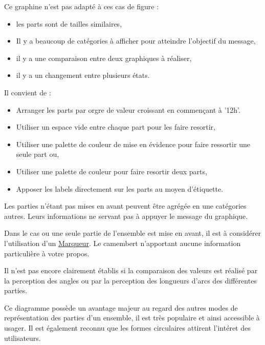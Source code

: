 \documentclass[a4paper,12pt]{article}
\begin{document}
\begin{multicols}{2}
Ce graphine n'est pas adapté à ces cas de figure :
\begin{itemize}
\item les parts sont de tailles similaires,\autocite{sosulskiGraphics2019}
\item Il y a beaucoup de catégories à afficher pour atteindre l'objectif du message,
\item il y a une comparaison entre deux graphiques à réaliser,\autocite{jonathanschwabishParttowhole2021}
\item il y a un changement entre plusieurs états.\autocite{wilkeDirectoryVisualizations2019}
\end{itemize}

Il convient de :
\begin{itemize}
\item Arranger les parts par orgre de valeur croissant en commençant à '12h'. \autocite{jonathanschwabishParttowhole2021}
\item Utiliser un espace vide entre chaque part pour les faire resortir, \autocite{sosulskiGraphics2019}
\item Utiliser une palette de couleur de mise en évidence pour faire ressortir une seule part ou,
\item Utiliser une palette de couleur pour faire resortir deux parts,
\item Apposer les labels directement sur les parts au moyen d'étiquette. \autocite{sosulskiGraphics2019}
\end{itemize}

Les parties n'étant pas mises en avant peuvent être agrégée en une catégories \og autres\fg{}. Leurs informations ne servant pas à appuyer le message du graphique. \autocite{jonathanschwabishParttowhole2021}

Dans le cas ou une seule partie de l'ensemble est mise en avant, il est à considérer l'utilisation d'un \hyperref[sec:org3631846]{Marqueur}. Le camembert n'apportant aucune information particulière à votre propos.

Il n'est pas encore clairement établis si la comparaison des valeurs est réalisé par la perception des angles ou par la perception des longueurs d'arcs des différentes parties.\autocite{jonathanschwabishParttowhole2021}

Ce diagramme possède un avantage majeur au regard des autres modes de représentation des parties d'un ensemble, il est très populaire et ainsi accessible à usager. \autocite{jonathanschwabishParttowhole2021} Il est également reconnu que les formes circulaires attirent l'intéret des utilisateurs.\autocite{jonathanschwabishParttowhole2021}

\end{multicols}
\end{document}
